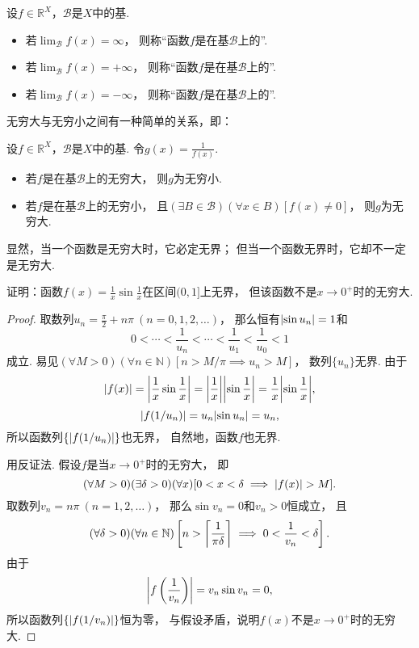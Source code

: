 \begin{definition}
设\(f\in\mathbb{R}^X\)，\(\mathcal{B}\)是\(X\)中的基.
\begin{itemize}
	\item 若\(\lim_\mathcal{B} f(x) = \infty\)，
	则称“函数\(f\)是在基\(\mathcal{B}\)上的”.

	\item 若\(\lim_\mathcal{B} f(x) = +\infty\)，
	则称“函数\(f\)是在基\(\mathcal{B}\)上的”.

	\item 若\(\lim_\mathcal{B} f(x) = -\infty\)，
	则称“函数\(f\)是在基\(\mathcal{B}\)上的”.
\end{itemize}
\end{definition}

无穷大与无穷小之间有一种简单的关系，即：
\begin{theorem}\label{theorem:极限.无穷大与无穷小的关系}
设\(f\in\mathbb{R}^X\)，\(\mathcal{B}\)是\(X\)中的基.
令\(g(x) = \frac1{f(x)}\).
\begin{itemize}
	\item 若\(f\)是在基\(\mathcal{B}\)上的无穷大，
	则\(g\)为无穷小.

	\item 若\(f\)是在基\(\mathcal{B}\)上的无穷小，
	且\((\exists B\in\mathcal{B})(\forall x\in B)[f(x) \neq 0]\)，
	则\(g\)为无穷大.
\end{itemize}
\end{theorem}

显然，当一个函数是无穷大时，它必定无界；
但当一个函数无界时，它却不一定是无穷大.
\begin{example}
证明：函数\(f(x) = \frac1x \sin\frac1x\)在区间\((0,1]\)上无界，
但该函数不是\(x\to0^+\)时的无穷大.
\begin{proof}
取数列\(u_n = \frac{\pi}{2} + n\pi\ (n=0,1,2,\dotsc)\)，
那么恒有\(\abs{\sin u_n} = 1\)和\[
	0 < \dotsb < \frac1{u_n} < \dotsb < \frac1{u_1} < \frac1{u_0} < 1
\]成立.
易见\((\forall M > 0)(\forall n\in\mathbb{N})[n > M/\pi \implies u_n > M]\)，
数列\(\{u_n\}\)无界.
由于\[
	\abs{f(x)} = \abs{\frac1x \sin\frac1x}
	= \abs{\frac1x} \abs{\sin\frac1x}
	= \frac1x \abs{\sin\frac1x},
\]\[
	\abs{f(1/u_n)}
	= u_n \abs{\sin u_n}
	= u_n,
\]
所以函数列\(\{\abs{f(1/u_n)}\}\)也无界，
自然地，函数\(f\)也无界.

用反证法.
假设\(f\)是当\(x\to0^+\)时的无穷大，
即\[
	(\forall M>0)
	(\exists\delta>0)
	(\forall x)
	[
		0<x<\delta
		\implies
		\abs{f(x)}>M
	].
\]
取数列\(v_n = n\pi\ (n=1,2,\dotsc)\)，
那么\(\sin v_n = 0\)和\(v_n>0\)恒成立，
且\[
	(\forall\delta>0)
	(\forall n\in\mathbb{N})
	\left[n>\ceil*{\frac1{\pi\delta}} \implies 0<\frac1{v_n}<\delta\right].
\]
由于\[
	\abs{f\left(\frac1{v_n}\right)}
	= v_n \sin v_n
	= 0,
\]
所以函数列\(\{\abs{f(1/v_n)}\}\)恒为零，
与假设矛盾，说明\(f(x)\)不是\(x\to0^+\)时的无穷大.
\end{proof}
\end{example}

